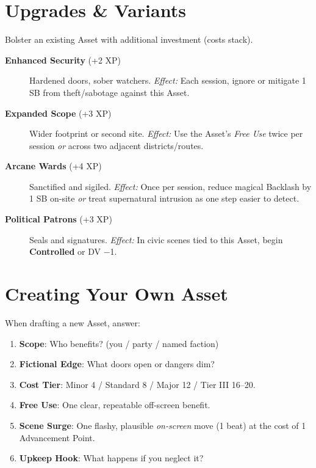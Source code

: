\section{Upgrades \& Variants}
Bolster an existing Asset with additional investment (costs stack).
\begin{description}
  \item[\textbf{Enhanced Security} (+2 XP)]  Hardened doors, sober watchers. \emph{Effect:} Each session, ignore or mitigate 1 SB from theft/sabotage against this Asset.
  \item[\textbf{Expanded Scope} (+3 XP)]  Wider footprint or second site. \emph{Effect:} Use the Asset’s \emph{Free Use} twice per session \emph{or} across two adjacent districts/routes.
  \item[\textbf{Arcane Wards} (+4 XP)]  Sanctified and sigiled. \emph{Effect:} Once per session, reduce magical Backlash by 1 SB on-site \emph{or} treat supernatural intrusion as one step easier to detect.
  \item[\textbf{Political Patrons} (+3 XP)]  Seals and signatures. \emph{Effect:} In civic scenes tied to this Asset, begin \textbf{Controlled} or DV −1.
\end{description}

\section{Creating Your Own Asset}
When drafting a new Asset, answer:
\begin{enumerate}
  \item \textbf{Scope}: Who benefits? (you / party / named faction)
  \item \textbf{Fictional Edge}: What doors open or dangers dim?
  \item \textbf{Cost Tier}: Minor 4 / Standard 8 / Major 12 / Tier III 16–20.
  \item \textbf{Free Use}: One clear, repeatable off-screen benefit.
  \item \textbf{Scene Surge}: One flashy, plausible \emph{on-screen} move (1 beat) at the cost of 1 Advancement Point.
  \item \textbf{Upkeep Hook}: What happens if you neglect it?
\end{enumerate}

